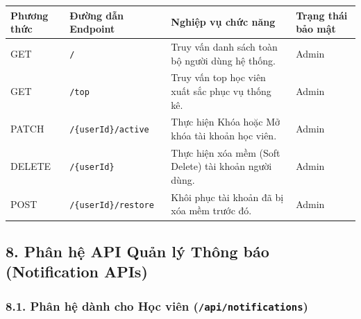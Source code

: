 \documentclass[12pt,a4paper]{article}
\renewcommand{\_}{\BreakableUnderscore}
\begin{document}
\begin{longtable}[]{
  |>{\raggedright\arraybackslash}p{}
  |>{\raggedright\arraybackslash}p{}
  |>{\raggedright\arraybackslash}p{}
  |>{\raggedright\arraybackslash}p{}|}
\hline\rowcolor{tableHeader}
\begin{minipage}[b]{\linewidth}\raggedright
Phương thức
\end{minipage} & \begin{minipage}[b]{\linewidth}\raggedright
Đường dẫn Endpoint
\end{minipage} & \begin{minipage}[b]{\linewidth}\raggedright
Nghiệp vụ chức năng
\end{minipage} & \begin{minipage}[b]{\linewidth}\raggedright
Trạng thái bảo mật
\end{minipage} \\
\hline
\endhead
\hline
\endlastfoot
GET & \texttt{/} & Truy vấn danh sách toàn bộ người dùng hệ thống. & Admin \\
\hline
GET & \texttt{/top} & Truy vấn top học viên xuất sắc phục vụ thống kê. & Admin \\
\hline
PATCH & \texttt{/\{userId\}/active} & Thực hiện Khóa hoặc Mở khóa tài khoản học viên. & Admin \\
\hline
DELETE & \texttt{/\{userId\}} & Thực hiện xóa mềm (Soft Delete) tài khoản người dùng. & Admin \\
\hline
POST & \texttt{/\{userId\}/restore} & Khôi phục tài khoản đã bị xóa mềm trước đó. & Admin \\
\hline
\end{longtable}

\subsection{8. Phân hệ API Quản lý Thông báo (Notification APIs)}

\subsubsection{\texorpdfstring{8.1. Phân hệ dành cho Học viên (\texttt{/api/notifications})}{8.1. Phân hệ dành cho Học viên (/api/notifications)}}
\end{document}
